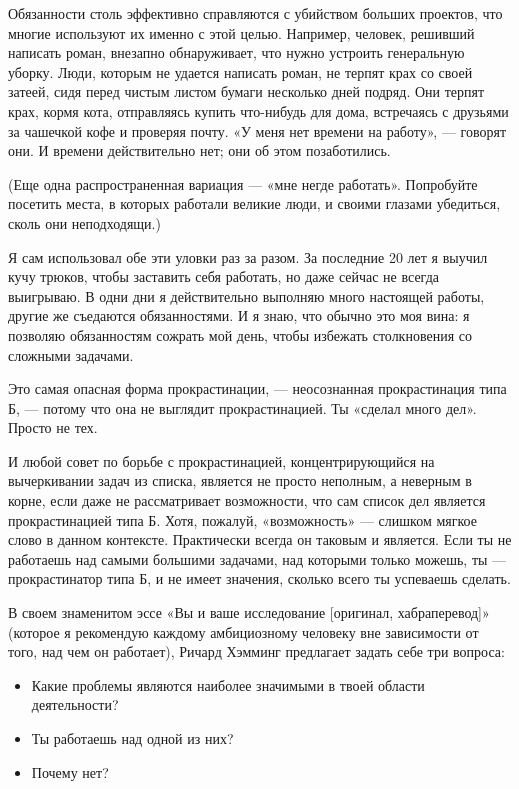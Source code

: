 \documentclass[ebook,12pt,oneside,openany]{memoir}
\begin{document}
Обязанности столь эффективно справляются с убийством больших проектов,
что многие используют их именно с этой целью. Например, человек,
решивший написать роман, внезапно обнаруживает, что нужно устроить
генеральную уборку. Люди, которым не удается написать роман, не терпят
крах со своей затеей, сидя перед чистым листом бумаги несколько дней
подряд. Они терпят крах, кормя кота, отправляясь купить что-нибудь для
дома, встречаясь с друзьями за чашечкой кофе и проверяя почту. «У меня
нет времени на работу», — говорят они. И времени действительно нет;
они об этом позаботились. \newline

(Еще одна распространенная вариация — «мне негде работать». Попробуйте
посетить места, в которых работали великие люди, и своими глазами
убедиться, сколь они неподходящи.) \newline

Я сам использовал обе эти уловки раз за разом. За последние 20 лет я
выучил кучу трюков, чтобы заставить себя работать, но даже сейчас не
всегда выигрываю. В одни дни я действительно выполняю много настоящей
работы, другие же съедаются обязанностями. И я знаю, что обычно это
моя вина: я позволяю обязанностям сожрать мой день, чтобы избежать
столкновения со сложными задачами. \newline

Это самая опасная форма прокрастинации, — неосознанная прокрастинация
типа Б, — потому что она не выглядит прокрастинацией. Ты «сделал много
дел». Просто не тех. \newline

И любой совет по борьбе с прокрастинацией, концентрирующийся на
вычеркивании задач из списка, является не просто неполным, а неверным
в корне, если даже не рассматривает возможности, что сам список дел
является прокрастинацией типа Б. Хотя, пожалуй, «возможность» —
слишком мягкое слово в данном контексте. Практически всегда он таковым
и является. Если ты не работаешь над самыми большими задачами, над
которыми только можешь, ты — прокрастинатор типа Б, и не имеет
значения, сколько всего ты успеваешь сделать. \newline

В своем знаменитом эссе «Вы и ваше исследование [оригинал,
хабраперевод]» (которое я рекомендую каждому амбициозному человеку вне
зависимости от того, над чем он работает), Ричард Хэмминг предлагает
задать себе три вопроса: \newline

\begin{itemize}
\item{Какие проблемы являются наиболее значимыми в твоей области
деятельности?}

\item{Ты работаешь над одной из них?}

\item{Почему нет?}
\end{itemize}
\end{document}

